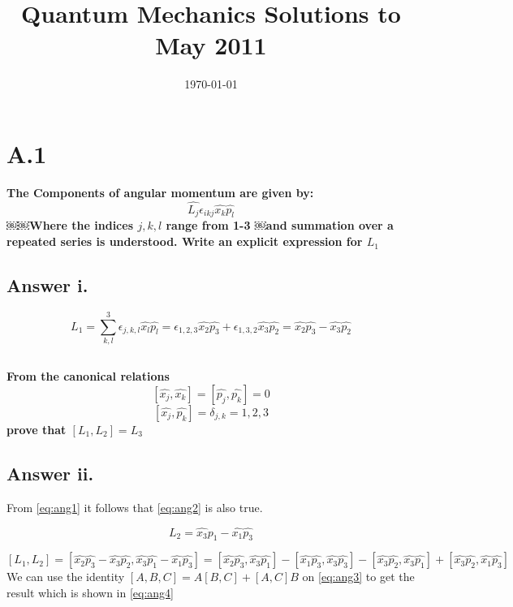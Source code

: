\documentclass[12pt]{article}
\title{Quantum Mechanics Solutions to May 2011}
\author{}
\date{\today}
\begin{document}
\maketitle

\section*{A.1}
\noindent
\textbf{The Components of angular momentum are given by: $$\hat{L_{j}}\epsilon_{ikj}\hat{x_{k}}\hat{p_{l}}$$ ￼￼Where the indices $j,k,l$ range from 1-3 ￼and summation over a repeated series is understood. Write an explicit expression for $L_{1}$}
\subsection*{Answer i.}
\begin{equation}
\label{eq:ang1}
L_{1}=\sum^{3}_{k,l}\epsilon_{j,k,l}\hat{x_{l}}\hat{p_{l}}=\epsilon_{1,2,3}\hat{x_{2}}\hat{p_{3}}+\epsilon_{1,3,2}\hat{x_{3}}\hat{p_{2}} 
=\hat{x_{2}}\hat{p_{3}}-\hat{x_{3}}\hat{p_{2}}
\end{equation}
\subsection*{}
\textbf{From the canonical relations $$[\hat{x_{j}},\hat{x_{k}}]=[\hat{p_{j}},\hat{p_{k}}]=0$$
 $$[\hat{x_{j}},\hat{p_{k}}]=\delta_{j,k}=1,2,3$$ \noindent
 prove that $[L_{1},L_{2}]=L_{3}$}

\subsection*{Answer ii.}
\noindent
From \cref{eq:ang1} it follows that \cref{eq:ang2} is also true. 


\begin{equation}
\label{eq:ang2}
L_{2}=\hat{x_{3}}\hat{p_{1}}-\hat{x_{1}}\hat{p_{3}}
\end{equation}

\begin{equation}
\label{eq:ang3}
[L_{1},L_{2}]=[\hat{x_{2}}\hat{p_{3}}-\hat{x_{3}}\hat{p_{2}},\hat{x_{3}}\hat{p_{1}}-\hat{x_{1}}\hat{p_{3}}]=
[\hat{x_{2}}\hat{p_{3}},\hat{x_{3}}\hat{p_{1}}]-[\hat{x_{1}}\hat{p_{3}},\hat{x_{3}}\hat{p_{3}}]-[\hat{x_{3}}\hat{p_{2}},\hat{x_{3}}\hat{p_{1}}]+
[\hat{x_{3}}\hat{p_{2}},\hat{x_{1}}\hat{p_{3}}]
\end{equation}
\noindent
We can use the identity $[A,B,C]=A[B,C]+[A,C]B$ on \cref{eq:ang3} to get the result which is shown in \cref{eq:ang4}
\end{document}
